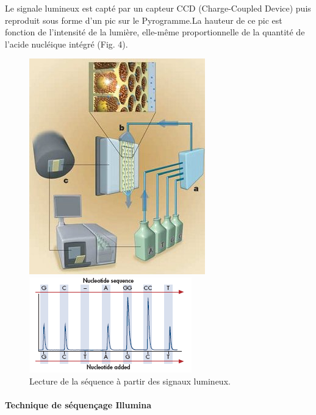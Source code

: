 Le signale lumineux est capté par un capteur CCD (Charge-Coupled Device) puis reproduit sous forme d’un pic sur le Pyrogramme.La hauteur de ce pic est fonction de l'intensité de la lumière, elle-même proportionnelle de la quantité de l'acide nucléique intégré (Fig. 4).
\begin{figure}[!h]
   \begin{minipage}[b]{0.40\linewidth}
      \centering \includegraphics[scale=0.5]{Images/mach.png}
   \end{minipage}\hfill
   \begin{minipage}[b]{0.48\linewidth}   
      \centering \includegraphics[scale=0.7]{Images/sign.png}
   \end{minipage}
   \caption{Lecture de la séquence à partir des signaux lumineux.}
\end{figure}
\paragraph*{Technique de séquençage Illumina}

